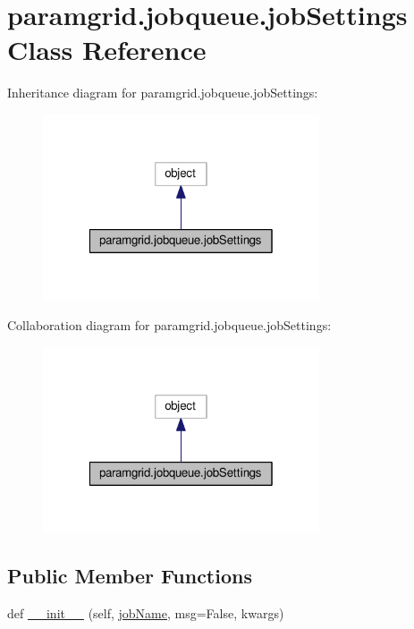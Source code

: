 \hypertarget{classparamgrid_1_1jobqueue_1_1jobSettings}{}\section{paramgrid.\+jobqueue.\+job\+Settings Class Reference}
\label{classparamgrid_1_1jobqueue_1_1jobSettings}


Inheritance diagram for paramgrid.\+jobqueue.\+job\+Settings\+:
\nopagebreak
\begin{figure}[H]
\begin{center}
\leavevmode
\includegraphics[width=232pt]{classparamgrid_1_1jobqueue_1_1jobSettings__inherit__graph}
\end{center}
\end{figure}


Collaboration diagram for paramgrid.\+jobqueue.\+job\+Settings\+:
\nopagebreak
\begin{figure}[H]
\begin{center}
\leavevmode
\includegraphics[width=232pt]{classparamgrid_1_1jobqueue_1_1jobSettings__coll__graph}
\end{center}
\end{figure}
\subsection*{Public Member Functions}
\begin{DoxyCompactItemize}
\item 
def \mbox{\hyperlink{classparamgrid_1_1jobqueue_1_1jobSettings_af7b91d302fe54e1ad1922b37ee821bfd}{\+\_\+\+\_\+init\+\_\+\+\_\+}} (self, \mbox{\hyperlink{classparamgrid_1_1jobqueue_1_1jobSettings_ab97074be0f8204269aa48d70c43de0e2}{job\+Name}}, msg=False, kwargs)
\end{DoxyCompactItemize}
